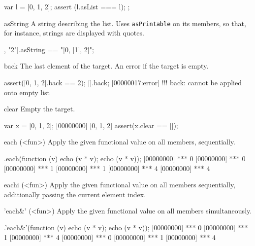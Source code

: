 \begin{urbiscriptapi}
\begin{urbiscript}
{
  var l = [0, 1, 2];
  assert (l.asList === l);
};
\end{urbiscript}

\item[asString]
  A string describing the list.  Uses \lstinline|asPrintable| on its
  members, so that, for instance, strings are displayed with quotes.

\begin{urbiassert}
[0, [1], "2"].asString == "[0, [1], \"2\"]";
\end{urbiassert}

\item[back]
  The last element of the target. An error if the target is empty.

\begin{urbiscript}
assert([0, 1, 2].back == 2);
[].back;
[00000017:error] !!! back: cannot be applied onto empty list
\end{urbiscript}

\item[clear]
  Empty the target.

\begin{urbiscript}
var x = [0, 1, 2];
[00000000] [0, 1, 2]
assert(x.clear == []);
\end{urbiscript}

\item[each](<fun>)%
  Apply the given functional value  on all members,
  sequentially.

\begin{urbiscript}
[0, 1, 2].each(function (v) {echo (v * v); echo (v * v)});
[00000000] *** 0
[00000000] *** 0
[00000000] *** 1
[00000000] *** 1
[00000000] *** 4
[00000000] *** 4
\end{urbiscript}

\item[eachi](<fun>)%
  Apply the given functional value  on all members
  sequentially, additionally passing the current element index.


\item['each&'](<fun>)%
Apply the given functional value on all members simultaneously.

\begin{urbiscript}
[0, 1, 2].'each&'(function (v) {echo (v * v); echo (v * v)});
[00000000] *** 0
[00000000] *** 1
[00000000] *** 4
[00000000] *** 0
[00000000] *** 1
[00000000] *** 4
\end{urbiscript}


\end{urbiscriptapi}
